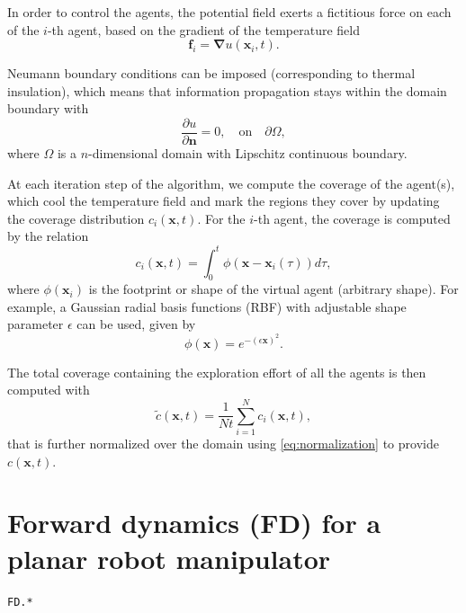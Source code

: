 \documentclass[10pt,a4paper]{article} %
\newcommand{\filename}[1]{\colorbox{rr2}{\color{white}\texttt{#1}}}
\begin{document}
In order to control the agents, the potential field exerts a fictitious force on each of the $i$-th agent, based on the gradient of the temperature field
\begin{equation}
   \bm{f}_i = \bm{\nabla}u(\bm{x}_i,t).
   \label{eq:force}
\end{equation} 

Neumann boundary conditions can be imposed (corresponding to thermal insulation), which means that information propagation stays within the domain boundary with
\begin{equation}
    \frac{\partial u}{\partial \textbf{n}} = 0, \quad \text{on} \quad \partial \Omega,
\end{equation}
where $\Omega$ is a $n$-dimensional domain with Lipschitz continuous boundary.

At each iteration step of the algorithm, we compute the coverage of the agent(s), which cool the temperature field and mark the regions they cover by updating the coverage distribution $c_i(\bm{x},t)$. For the $i$-th agent, the coverage is computed by the relation
\begin{equation}
    c_i(\bm{x},t) = \int_{0}^t \phi(\bm{x}-\bm{x}_i(\tau))d\tau,
\end{equation}
where $\phi(\bm{x}_i)$ is the footprint or shape of the virtual agent (arbitrary shape). For example, a Gaussian radial basis functions (RBF) with adjustable shape parameter $\epsilon$ can be used, given by
\begin{equation}
    \phi(\bm{x}) = e^{-\left(\epsilon \bm{x} \right)^2}.
    \label{eq:RBF}
\end{equation}

The total coverage containing the exploration effort of all the agents is then computed with
\begin{equation}
    \tilde{c}(\bm{x},t) = \frac{1}{Nt}\sum_{i=1}^{N} c_i(\bm{x},t),
    \label{eq:coverage}
\end{equation}
that is further normalized over the domain using \eqref{eq:normalization} to provide $c(\bm{x},t)$. 


\section{Forward dynamics (FD) for a planar robot manipulator}\label{sec:FD}
\begin{flushright}
\filename{FD.*}
\end{flushright}
\end{document}
